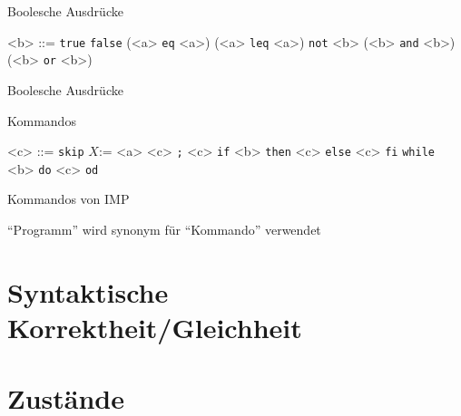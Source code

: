 \begin{description}[leftmargin = 2cm]
									\item[\textit{BExp}] Boolesche Ausdrücke
										\begin{description}[leftmargin = 3cm]
											\item[Definition:]
												\begin{grammar}
													<b> ::= \texttt{true}
													\alt \texttt{false}
													\alt (<a> \texttt{eq} <a>)
													\alt (<a> \texttt{leq} <a>)
													\alt \texttt{not} <b>
													\alt (<b> \texttt{and} <b>)
													\alt (<b> \texttt{or} <b>)
												\end{grammar}
											\item[Intuition:] Boolesche Ausdrücke
										\end{description}
									\item[\textit{Com}] Kommandos
										\begin{description}[leftmargin = 3cm]
											\item[Definition:]
												\begin{grammar}
													<c> ::= \texttt{skip}
													\alt $ X \texttt {:=} $ <a>
													\alt <c> \texttt{;} <c>
													\alt \texttt{if} <b> \texttt{then} <c> \texttt{else} <c> \texttt{fi}
													\alt \texttt{while} <b> \texttt{do} <c> \texttt{od}
												\end{grammar}
											\item[Intuition:] Kommandos von IMP
											\item[Konvention:] \enquote{Programm} wird synonym für \enquote{Kommando} verwendet
										\end{description}
								\end{description}

						\section{Syntaktische Korrektheit/Gleichheit}


						\section{Zustände}

